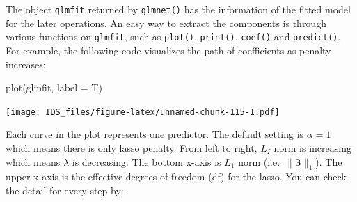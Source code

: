 \documentclass[
  12pt,
]{krantz}
\makeatletter
\newenvironment{Shaded}{\begin{snugshade}}{\end{snugshade}}
\newcommand{\AttributeTok}[1]{\textcolor[rgb]{0.61,0.61,0.61}{#1}}
\newcommand{\CommentTok}[1]{\textcolor[rgb]{0.37,0.37,0.37}{\textit{#1}}}
\newcommand{\DecValTok}[1]{\textcolor[rgb]{0.06,0.06,0.06}{#1}}
\newcommand{\FunctionTok}[1]{\textcolor[rgb]{0,0,0}{#1}}
\newcommand{\NormalTok}[1]{#1}
\newcommand{\OtherTok}[1]{\textcolor[rgb]{0.37,0.37,0.37}{#1}}
\newcommand{\SpecialCharTok}[1]{\textcolor[rgb]{0,0,0}{#1}}
\newcommand{\StringTok}[1]{\textcolor[rgb]{0.5,0.5,0.5}{#1}}
\newenvironment{kframe}{%
\medskip{}
\setlength{\fboxsep}{.8em}
 \def\at@end@of@kframe{}%
 \ifinner\ifhmode%
  \def\at@end@of@kframe{\end{minipage}}%
  \begin{minipage}{\columnwidth}%
 \fi\fi%
 \def\FrameCommand##1{\hskip\@totalleftmargin \hskip-\fboxsep
 \colorbox{shadecolor}{##1}\hskip-\fboxsep
     \hskip-\linewidth \hskip-\@totalleftmargin \hskip\columnwidth}%
 \MakeFramed {\advance\hsize-\width
   \@totalleftmargin\z@ \linewidth\hsize
   \@setminipage}}%
 {\par\unskip\endMakeFramed%
 \at@end@of@kframe}
\renewenvironment{Shaded}{\begin{kframe}}{\end{kframe}}
\makeatother
\begin{document}
\begin{Shaded}
\end{Shaded}

The object \texttt{glmfit} returned by \texttt{glmnet()} has the information of the fitted model for the later operations. An easy way to extract the components is through various functions on \texttt{glmfit}, such as \texttt{plot()}, \texttt{print()}, \texttt{coef()} and \texttt{predict()}. For example, the following code visualizes the path of coefficients as penalty increases:

\begin{Shaded}
\begin{Highlighting}[]
\FunctionTok{plot}\NormalTok{(glmfit, }\AttributeTok{label =}\NormalTok{ T)}
\end{Highlighting}
\end{Shaded}

\texttt{[image: IDS\_files/figure-latex/unnamed-chunk-115-1.pdf]}

Each curve in the plot represents one predictor. The default setting is \(\alpha=1\) which means there is only lasso penalty. From left to right, \(L_I\) norm is increasing which means \(\lambda\) is decreasing. The bottom x-axis is \(L_1\) norm (i.e.~\(\parallel\mathbf{\beta}\parallel_{1}\)). The upper x-axis is the effective degrees of freedom (df) for the lasso. You can check the detail for every step by:
\end{document}

